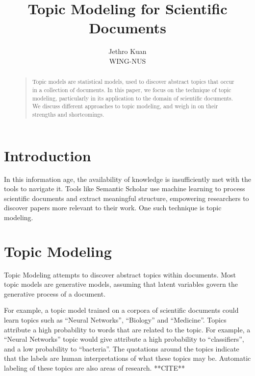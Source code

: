 \documentclass[letterpaper]{article}
\begin{document}
\nocopyright


\title{Topic Modeling for Scientific Documents}
\author{Jethro Kuan \\
  WING-NUS\\
}
\maketitle
\begin{abstract}
  \begin{quote}
    Topic models are statistical models, used to discover abstract
    topics that occur in a collection of documents. In this paper, we
    focus on the technique of topic modeling, particularly in its
    application to the domain of scientific documents. We discuss
    different approaches to topic modeling, and weigh in on their
    strengths and shortcomings.
  \end{quote}
\end{abstract}

\section{Introduction}
In this information age, the availability of knowledge is
insufficiently met with the tools to navigate it. Tools like Semantic
Scholar use machine learning to process scientific documents and
extract meaningful structure, empowering researchers to discover
papers more relevant to their work. One such technique is topic
modeling.

\section {Topic Modeling}
Topic Modeling attempts to discover abstract topics within documents.
Most topic models are generative models, assuming that latent
variables govern the generative process of a document.

For example, a topic model trained on a corpora of scientific
documents could learn topics such as ``Neural Networks'', ``Biology''
and ``Medicine''. Topics attribute a high probability to words that
are related to the topic. For example, a ``Neural Networks'' topic
would give attribute a high probability to ``classifiers'', and a low
probability to ``bacteria''. The quotations around the topics indicate
that the labels are human interpretations of what these topics may be.
Automatic labeling of these topics are also areas of research.
**CITE**
\end{document}
